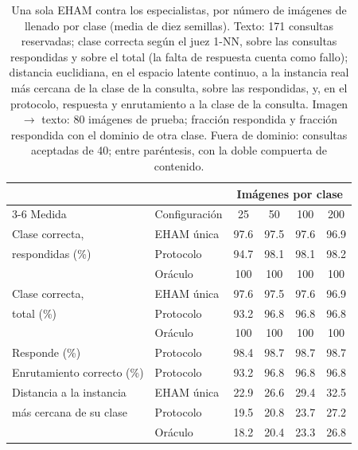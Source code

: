 \begin{table}[H]
    \centering
    \caption[Una sola EHAM contra los especialistas, por imágenes de llenado]{Una sola EHAM contra los especialistas, por número de imágenes de llenado
    por clase (media de diez semillas). Texto: 171 consultas reservadas; clase correcta
    según el juez 1-NN, sobre las consultas respondidas y sobre el total (la falta de
    respuesta cuenta como fallo); distancia euclidiana, en el espacio latente continuo,
    a la instancia real más cercana de la clase de la consulta, sobre las respondidas,
    y, en el protocolo, respuesta y enrutamiento a la clase de la consulta. Imagen $\to$
    texto: 80 imágenes de prueba; fracción respondida y fracción respondida con el
    dominio de otra clase. Fuera de dominio: consultas aceptadas de 40; entre
    paréntesis, con la doble compuerta de contenido.}
    \label{tab:eham-unica}
    \small
    \begin{tabular}{llcccc}
        \toprule
        & & \multicolumn{4}{c}{Imágenes por clase} \\
        \cmidrule(lr){3-6}
        Medida & Configuración & 25 & 50 & 100 & 200 \\
        \midrule
        Clase correcta,            & EHAM única & 97.6 & 97.5 & 97.6 & 96.9 \\
        respondidas (\%)           & Protocolo  & 94.7 & 98.1 & 98.1 & 98.2 \\
                                   & Oráculo    & 100  & 100  & 100  & 100  \\
        \midrule
        Clase correcta,            & EHAM única & 97.6 & 97.5 & 97.6 & 96.9 \\
        total (\%)                 & Protocolo  & 93.2 & 96.8 & 96.8 & 96.8 \\
                                   & Oráculo    & 100  & 100  & 100  & 100  \\
        \midrule
        Responde (\%)              & Protocolo  & 98.4 & 98.7 & 98.7 & 98.7 \\
        Enrutamiento correcto (\%) & Protocolo  & 93.2 & 96.8 & 96.8 & 96.8 \\
        \midrule
        Distancia a la instancia   & EHAM única & 22.9 & 26.6 & 29.4 & 32.5 \\
        más cercana de su clase    & Protocolo  & 19.5 & 20.8 & 23.7 & 27.2 \\
                                   & Oráculo    & 18.2 & 20.4 & 23.3 & 26.8 \\
        \midrule

\end{tabular}
\end{table}

